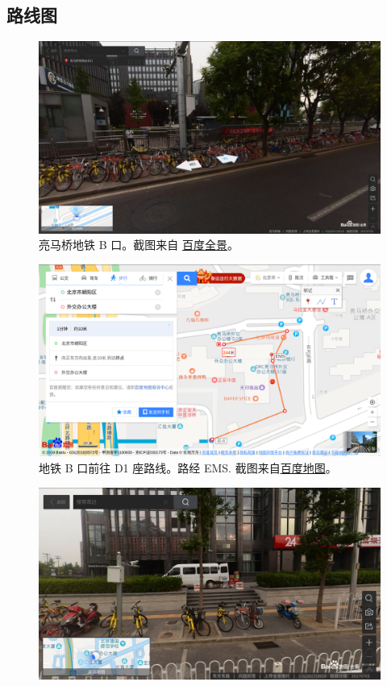 \documentclass[oneside,final]{book}
\begin{document}
\begin{appendices}
\section{路线图}
\begin{figure}[htbp]
  \centering
  \includegraphics[width=\linewidth]{metro-B}
  \caption[亮马桥地铁 B 口]{亮马桥地铁 B 口。截图来自 \href{https://map.baidu.com/\#panoid=09002200121707010630058282I\&panotype=street\&heading=0.64\&pitch=-4.92\&l=19\&tn=B_NORMAL_MAP\&sc=0\&newmap=1\&shareurl=1\&pid=09002200121707010630058282I}{百度全景}。}
  \label{fig:real}
\end{figure}
\begin{figure}
  \centering
  \includegraphics[width=\linewidth]{route-to-D1}
  \caption[地铁 B 口前往 D1 座路线]{地铁 B 口前往 D1 座路线。路经 EMS. 截图来自\href{https://map.baidu.com/}{百度地图}。}
  \label{fig:route}
\end{figure}
\begin{figure}
  \centering
  \includegraphics[width=\linewidth]{EMS}

\end{figure}
\end{appendices}
\end{document}
